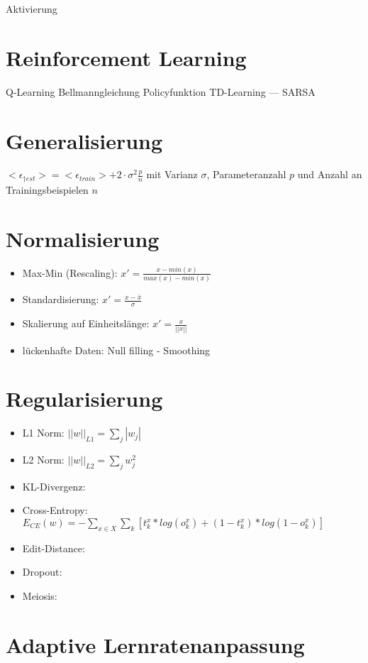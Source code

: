 \documentclass[paper=a4, fontsize=11pt]{scrartcl} %
\begin{document}
Aktivierung

\section{Reinforcement Learning}

Q-Learning
Bellmanngleichung
Policyfunktion
TD-Learning ---
SARSA

\section{Generalisierung}

$<\epsilon_{†est}> = <\epsilon_{train}> + 2 \cdot \sigma^2 \frac{p}{n}$ mit Varianz $\sigma$, Parameteranzahl $p$ und Anzahl an Trainingsbeispielen $n$


\section{Normalisierung}

\begin{itemize}
\item Max-Min (Rescaling): $x' = \frac{x - min(x)}{max(x) - min(x)}$
\item Standardisierung: $x' = \frac{x - \bar{x}}{\sigma}$
\item Skalierung auf Einheitslänge: $x' = \frac{x}{||x||}$
\item lückenhafte Daten: Null filling - Smoothing
\end{itemize}

\section{Regularisierung}

\begin{itemize}
\item L1 Norm: $||w||_{L1} = \sum\limits_j |w_j|$
\item L2 Norm: $||w||_{L2} = \sum\limits_j w^2_j$
\item KL-Divergenz:
\item Cross-Entropy: $E_{CE}(w) = - \sum\limits_{x \in X} \sum\limits_k [t^x_k * log(o^x_k) + (1-t^x_k)*log(1-o^x_k)]$
\item Edit-Distance: 
\item Dropout: 
\item Meiosis: 
\end{itemize}

\section{Adaptive Lernratenanpassung}
\end{document}
